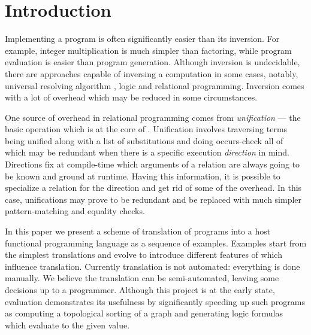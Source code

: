 \section{Introduction}

Implementing a program is often significantly easier than its inversion.
For example, integer multiplication is much simpler than factoring, while program evaluation is easier than program generation.
Although inversion is undecidable, there are approaches capable of inversing a computation in some cases, notably, universal resolving algorithm , logic and relational programming.
Inversion comes with a lot of overhead which may be reduced in some circumstances.

One source of overhead in relational programming comes from \emph{unification} --- the basic operation which is at the core of \mk.
Unification involves traversing terms being unified along with a list of substitutions and doing occurs-check all of which may be redundant when there is a specific execution \emph{direction} in mind.
Directions fix at compile-time which arguments of a relation are always going to be known and ground at runtime.
Having this information, it is possible to specialize a relation for the direction  and get rid of some of the overhead.
In this case, unifications may prove to be redundant and be replaced with much simpler pattern-matching and equality checks.

In this paper we present a scheme of translation of \mk programs into a host functional programming language as a sequence of examples.
Examples start from the simplest translations and evolve to introduce different features of \mk which influence translation.
Currently translation is not automated: everything is done manually.
We believe the translation can be semi-automated, leaving some decisions up to a programmer.
Although this project is at the early state, evaluation demonstrates its usefulness by significantly speeding up such programs as computing a topological sorting of a graph and generating logic formulas which evaluate to the given value.




